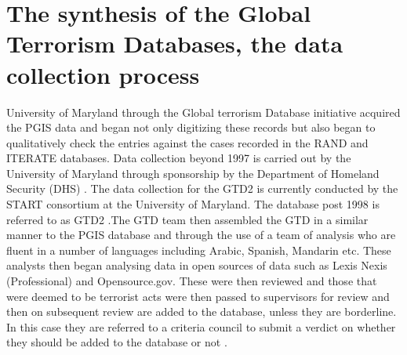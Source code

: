 \section{The synthesis of the Global Terrorism Databases, the data collection process}
\label{sec:synglobalter}

University of Maryland through the Global terrorism Database initiative acquired the PGIS data and began not only digitizing these records but also began to qualitatively check the entries against the cases recorded in the RAND and ITERATE databases. Data collection beyond 1997 is carried out by the University of Maryland through sponsorship by the Department of Homeland Security (DHS) \citep{lafree2011building}. The data collection for the GTD2 is currently conducted by the START \citep{startGTD2016} consortium at the University of Maryland. The database post 1998 is referred to as GTD2 \citep{lafree2010global}.The GTD team then assembled the GTD in a similar manner to the PGIS database and through the use of a team of analysis who are fluent in a number of languages including Arabic, Spanish, Mandarin etc. These analysts then began analysing data in open sources of data such as Lexis Nexis (Professional) and Opensource.gov. These were then reviewed and those that were deemed to be terrorist acts were then passed to supervisors for review and then on subsequent review are added to the database, unless they are borderline. In this case they are referred to a criteria council to submit a verdict on whether they should be added to the database or not \citep{lafree2012generating}.

